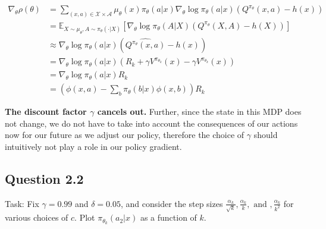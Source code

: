 \documentclass[a4paper, 11pt]{article} %
\begin{document}
\begin{align} \nabla_{\theta} \rho(\theta)
&=\sum_{(x, a) \in \mathcal{X} \times \mathcal{A}} \mu_{\theta}(x) \pi_{\theta}(a | x) \nabla_{\theta} \log \pi_{\theta}(a | x)\left(Q^{\pi_\theta}(x, a)-h(x)\right) \\
&=\mathbb{E}_{X \sim \mu_{\theta}, A \sim \pi_{\theta}(\cdot | X)}\left[\nabla_{\theta} \log \pi_{\theta}(A | X)\left(Q^{\pi_{\theta}}(X, A)-h(X)\right)\right] \\
&\approx \nabla_{\theta} \log \pi_{\theta}(a | x)  \left(\widehat{Q^{\pi_{\theta}}(x, a)}-h(x)\right) \\
&=\nabla_{\theta} \log \pi_{\theta}(a | x)  \left(R_{k}+\gamma V^{\pi_{\theta_{k}}}(x) - \gamma V^{\pi_{\theta_{k}}}(x)\right) \\
&=\nabla_{\theta} \log \pi_{\theta}(a | x)  R_{k} \\
&=\left(  \phi(x, a)-\sum_{b} \pi_{\theta}(b|x) \phi(x, b)\right)R_{k}
\end{align}

\textbf{The discount factor $\gamma$ cancels out.} Further, since the state in this MDP does not change, we do not have to take into account the consequences of our actions now for our future as we adjust our policy, therefore the choice of  $\gamma$ should intuitively not play a role in our policy gradient.

\subsection*{Question 2.2}

Task: Fix $\gamma = 0.99$ and $\delta = 0.05$, and consider the step sizes $\frac{\alpha_{k}}{\sqrt{k}} ,\frac{\alpha_{k}}{k}, \text { and },\frac{\alpha_{k}}{k^{2}}$ for various choices of $c$. Plot $\pi_{\theta_{k}}(a_{2}|x)$ as a function of $k$. \\
\end{document}

